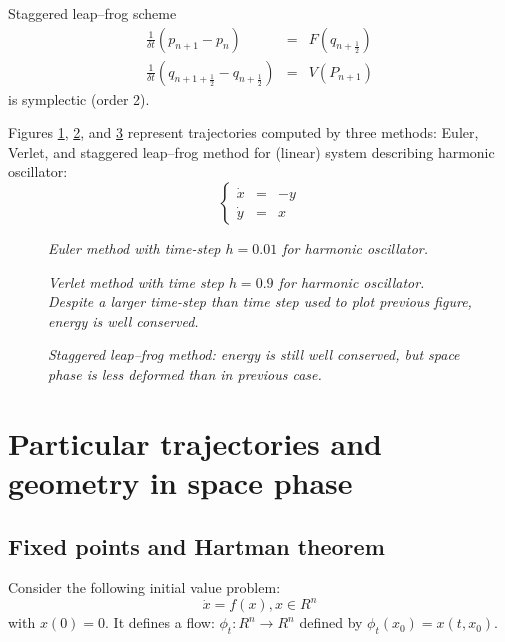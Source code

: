 \documentclass[12pt]{book}
\begin{document}
\begin{exmp}
Staggered leap--frog scheme
\begin{eqnarray}
\frac{1}{\delta t}(p_{n+1}-p_{n})&=&F(q_{n+\frac{1}{2}})\\
\frac{1}{\delta t}(q_{n+1+\frac{1}{2}}-q_{n+\frac{1}{2}})&=&V(P_{n+1})
\end{eqnarray}
is symplectic (order 2).
\end{exmp}
Figures \ref{codefigure1}, \ref{codefigure2}, and \ref{codefigure3} represent
trajectories computed by three methods: Euler, Verlet, and staggered leap--frog
method for (linear) system describing harmonic oscillator:
\begin{equation}
\left\{ \begin{array}{lcr}
\dot x&=&-y\\
\dot y&=&x
\end{array}\right.
\end{equation}
\begin{figure}[tbh]
\centerline{}
\caption{\it Euler method with time-step $h=0.01$ for harmonic oscillator.}
\label{codefigure1}
\end{figure}
%
\begin{figure}[tbh]
\centerline{}   
\caption{\it Verlet method with time step $h=0.9$ for harmonic
  oscillator. Despite a larger time-step than time step used to plot previous
  figure, energy is well conserved.}
\label{codefigure2}
\end{figure}
%
\begin{figure}[tbh]
\centerline{}   
\caption{\it Staggered leap--frog method: energy is still well conserved, but
  space phase is less deformed than in previous case.}
\label{codefigure3}
\end{figure}
%


\section{Particular trajectories and geometry in space phase}


\subsection{Fixed points and Hartman theorem}
Consider the following initial value problem:
\begin{equation}\label{eqnl}
\dot x=f(x), x\in R^n
\end{equation}
with $x(0)=0$.
It defines a flow: $\phi_t:R^n\rightarrow R^n$ defined by
$\phi_t(x_0)=x(t,x_0)$.
\end{document}
